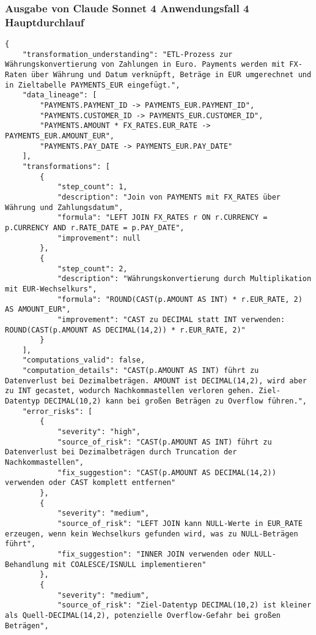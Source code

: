 \subsubsection{Ausgabe von Claude Sonnet 4 Anwendungsfall 4 Hauptdurchlauf}\label{anhang:subsubsec:claude_case4_prompt1}
\begin{lstlisting}[caption={Ausgabe: Claude Sonnet 4 Anwendungsfall 4 Hauptdurchlauf},label={claude_case4_prompt1}]
{
    "transformation_understanding": "ETL-Prozess zur Währungskonvertierung von Zahlungen in Euro. Payments werden mit FX-Raten über Währung und Datum verknüpft, Beträge in EUR umgerechnet und in Zieltabelle PAYMENTS_EUR eingefügt.",
    "data_lineage": [
        "PAYMENTS.PAYMENT_ID -> PAYMENTS_EUR.PAYMENT_ID",
        "PAYMENTS.CUSTOMER_ID -> PAYMENTS_EUR.CUSTOMER_ID",
        "PAYMENTS.AMOUNT * FX_RATES.EUR_RATE -> PAYMENTS_EUR.AMOUNT_EUR",
        "PAYMENTS.PAY_DATE -> PAYMENTS_EUR.PAY_DATE"
    ],
    "transformations": [
        {
            "step_count": 1,
            "description": "Join von PAYMENTS mit FX_RATES über Währung und Zahlungsdatum",
            "formula": "LEFT JOIN FX_RATES r ON r.CURRENCY = p.CURRENCY AND r.RATE_DATE = p.PAY_DATE",
            "improvement": null
        },
        {
            "step_count": 2,
            "description": "Währungskonvertierung durch Multiplikation mit EUR-Wechselkurs",
            "formula": "ROUND(CAST(p.AMOUNT AS INT) * r.EUR_RATE, 2) AS AMOUNT_EUR",
            "improvement": "CAST zu DECIMAL statt INT verwenden: ROUND(CAST(p.AMOUNT AS DECIMAL(14,2)) * r.EUR_RATE, 2)"
        }
    ],
    "computations_valid": false,
    "computation_details": "CAST(p.AMOUNT AS INT) führt zu Datenverlust bei Dezimalbeträgen. AMOUNT ist DECIMAL(14,2), wird aber zu INT gecastet, wodurch Nachkommastellen verloren gehen. Ziel-Datentyp DECIMAL(10,2) kann bei großen Beträgen zu Overflow führen.",
    "error_risks": [
        {
            "severity": "high",
            "source_of_risk": "CAST(p.AMOUNT AS INT) führt zu Datenverlust bei Dezimalbeträgen durch Truncation der Nachkommastellen",
            "fix_suggestion": "CAST(p.AMOUNT AS DECIMAL(14,2)) verwenden oder CAST komplett entfernen"
        },
        {
            "severity": "medium",
            "source_of_risk": "LEFT JOIN kann NULL-Werte in EUR_RATE erzeugen, wenn kein Wechselkurs gefunden wird, was zu NULL-Beträgen führt",
            "fix_suggestion": "INNER JOIN verwenden oder NULL-Behandlung mit COALESCE/ISNULL implementieren"
        },
        {
            "severity": "medium",
            "source_of_risk": "Ziel-Datentyp DECIMAL(10,2) ist kleiner als Quell-DECIMAL(14,2), potenzielle Overflow-Gefahr bei großen Beträgen",

\end{lstlisting}
